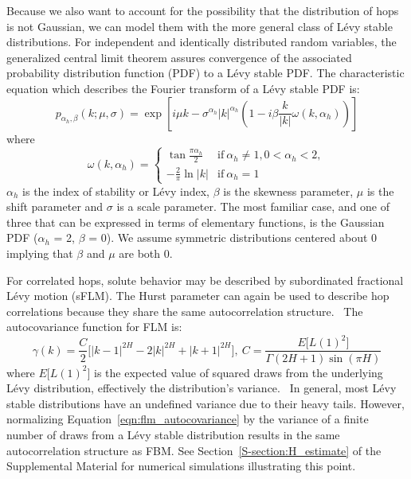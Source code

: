 \documentclass[aps,pre,preprint,groupedaddress,longbibliography]{revtex4-2}
\begin{document}
  Because we also want to account for the possibility that the distribution of
  hops is not Gaussian, we can model them with the more general class of L\'evy
  stable distributions. For independent and identically distributed random
  variables, the generalized central limit theorem assures convergence of the
  associated probability distribution function (PDF) to a L\'evy stable PDF.
  \cite{klages_anomalous_2008} The characteristic equation which describes the
  Fourier transform of a L\'evy stable PDF is: 
  \begin{equation}
    p_{\alpha_h, \beta}(k;\mu,\sigma) =\exp\left[i\mu k - \sigma^{\alpha_h}|k|^{\alpha_h}\left(1 - i\beta\frac{k}{|k|}\omega(k, \alpha_h)\right)\right]
  \end{equation}
  where \\
  \[\omega(k, \alpha_h) = \begin{cases}
  	\tan{\frac{\pi \alpha_h}{2}} & \text{if}~\alpha_h \neq 1, 0 < \alpha_h < 2, \\
  	-\frac{2}{\pi}\ln |k| & \text{if}~\alpha_h = 1
  	 \end{cases}
  \]
  $\alpha_h$ is the index of stability or L\'evy index, $\beta$ is the skewness 
  parameter, $\mu$ is the shift parameter and $\sigma$ is a scale parameter. The most
  familiar case, and one of three that can be expressed in terms of elementary functions,
  is the Gaussian PDF ($\alpha_h$ = 2, $\beta$ = 0). We assume symmetric distributions
  centered about 0 implying that $\beta$ and $\mu$ are both 0.
  
  For correlated hops, solute behavior may be described by subordinated
  fractional L\'evy motion (sFLM). The Hurst parameter can again be used to
  describe hop correlations because they share the same autocorrelation
  structure.~\cite{tikanmaki_fractional_2010} The autocovariance function for
  FLM is:
  \begin{equation}
    \gamma(k) = \dfrac{C}{2}\bigg[|k-1|^{2H} - 2|k|^{2H} + |k+1|^{2H}\bigg],
    ~C = \frac{E\big[L(1)^2\big]}{\Gamma(2H + 1)\sin(\pi H)}
    \label{eqn:flm_autocovariance}
  \end{equation}
  where $E\big[L(1)^2\big]$ is the expected value of squared draws from the 
  underlying L\'evy distribution, effectively the distribution's 
  variance.~\cite{bishwal_maximum_2011} In general, most L\'evy stable distributions
  have an undefined variance due to their heavy tails. However, normalizing
  Equation~\ref{eqn:flm_autocovariance} by the variance of a finite number of draws
  from a L\'evy stable distribution results in the same autocorrelation structure as FBM.
  See Section~\ref{S-section:H_estimate} of the Supplemental Material for numerical
  simulations illustrating this point.
  
\end{document}
